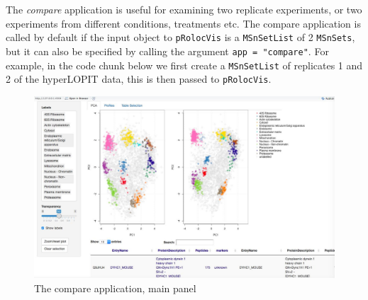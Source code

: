 The \textit{compare} application is useful for examining two replicate
experiments, or two experiments from different conditions, treatments
etc. The compare application is called by default if the input object
to \texttt{pRolocVis} is a \texttt{MSnSetList} of 2 \texttt{MSnSets},
but it can also be specified by calling the argument \texttt{app =
  "compare"}. For example, in the code chunk below we first create a
\texttt{MSnSetList} of replicates 1 and 2 of the hyperLOPIT data, this
is then passed to \texttt{pRolocVis}.

\begin{knitrout}
\color{fgcolor}\begin{kframe}
\begin{alltt}
 \hlkwb{<-} \hlstd{(}
  \hlstd{=} \hlstd{)}
\end{alltt}
\end{kframe}
\end{knitrout}

\begin{figure}[!ht]
  \centering
  \includegraphics[width=\textwidth]{./Figures/SS_Compare1.jpg}
  \caption{The compare application, main panel}
  \label{fig:compare}
\end{figure}

